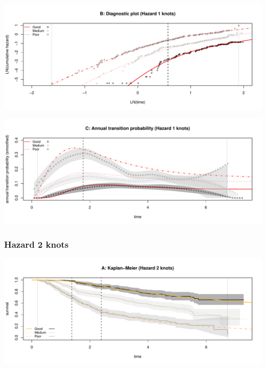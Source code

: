 \documentclass[
]{article}
\begin{document}
\begin{flushleft}\includegraphics[height=0.25\textheight]{BC_OS_output/Images/Figure_spline_models-2} \end{flushleft}

\begin{flushleft}\includegraphics[height=0.25\textheight]{BC_OS_output/Images/Figure_spline_models-3} \end{flushleft}

\clearpage

\subsubsection{Hazard 2 knots}\label{hazard-2-knots}

\begin{flushleft}\includegraphics[height=0.25\textheight]{BC_OS_output/Images/Figure_spline_models-4} \end{flushleft}
\end{document}
